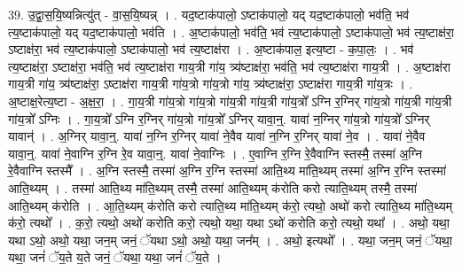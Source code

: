 \documentclass[17pt]{extarticle}
\begin{document}
39. उ॒द्वा॒स॒यि॒ष्यन्नित्यु॑त् - वा॒स॒यि॒ष्यन्न् । . यद॒ष्टाक॑पालो॒ ऽष्टाक॑पालो॒ यद् यद॒ष्टाक॑पालो॒ भव॑ति॒ भव॑ त्य॒ष्टाक॑पालो॒ यद् यद॒ष्टाक॑पालो॒ भव॑ति । . अ॒ष्टाक॑पालो॒ भव॑ति॒ भव॑ त्य॒ष्टाक॑पालो॒ ऽष्टाक॑पालो॒ भव॑ त्य॒ष्टाक्ष॑रा॒ ऽष्टाक्ष॑रा॒ भव॑ त्य॒ष्टाक॑पालो॒ ऽष्टाक॑पालो॒ भव॑ त्य॒ष्टाक्ष॑रा । . अ॒ष्टाक॑पाल॒ इत्य॒ष्टा - क॒पा॒लः॒ । . भव॑ त्य॒ष्टाक्ष॑रा॒ ऽष्टाक्ष॑रा॒ भव॑ति॒ भव॑ त्य॒ष्टाक्ष॑रा गाय॒त्री गा॑य॒ त्र्य॑ष्टाक्ष॑रा॒ भव॑ति॒ भव॑ त्य॒ष्टाक्ष॑रा गाय॒त्री । . अ॒ष्टाक्ष॑रा गाय॒त्री गा॑य॒ त्र्य॑ष्टाक्ष॑रा॒ ऽष्टाक्ष॑रा गाय॒त्री गा॑य॒त्रो गा॑य॒त्रो गा॑य॒ त्र्य॑ष्टाक्ष॑रा॒ ऽष्टाक्ष॑रा गाय॒त्री गा॑य॒त्रः । . अ॒ष्टाक्ष॒रेत्य॒ष्टा - अ॒क्ष॒रा॒ । . गा॒य॒त्री गा॑य॒त्रो गा॑य॒त्रो गा॑य॒त्री गा॑य॒त्री गा॑य॒त्रो᳚ ऽग्नि र॒ग्निर् गा॑य॒त्रो गा॑य॒त्री गा॑य॒त्री गा॑य॒त्रो᳚ ऽग्निः । . गा॒य॒त्रो᳚ ऽग्नि र॒ग्निर् गा॑य॒त्रो गा॑य॒त्रो᳚ ऽग्निर् यावा॒न्॒. यावा॑ न॒ग्निर् गा॑य॒त्रो गा॑य॒त्रो᳚ ऽग्निर् यावान्॑ । . अ॒ग्निर् यावा॒न्॒. यावा॑ न॒ग्नि र॒ग्निर् यावा॑ ने॒वैव यावा॑ न॒ग्नि र॒ग्निर् यावा॑ ने॒व । . यावा॑ ने॒वैव यावा॒न्॒. यावा॑ ने॒वाग्नि र॒ग्नि रे॒व यावा॒न्॒. यावा॑ ने॒वाग्निः । . ए॒वाग्नि र॒ग्नि रे॒वैवाग्नि स्तस्मै॒ तस्मा॑ अ॒ग्नि रे॒वैवाग्नि स्तस्मै᳚ । . अ॒ग्नि स्तस्मै॒ तस्मा॑ अ॒ग्नि र॒ग्नि स्तस्मा॑ आति॒थ्य मा॑ति॒थ्यम् तस्मा॑ अ॒ग्नि र॒ग्नि स्तस्मा॑ आति॒थ्यम् । . तस्मा॑ आति॒थ्य मा॑ति॒थ्यम् तस्मै॒ तस्मा॑ आति॒थ्यम् क॑रोति करो त्याति॒थ्यम् तस्मै॒ तस्मा॑ आति॒थ्यम् क॑रोति । . आ॒ति॒थ्यम् क॑रोति करो त्याति॒थ्य मा॑ति॒थ्यम् क॑रो॒ त्यथो॒ अथो॑ करो त्याति॒थ्य मा॑ति॒थ्यम् क॑रो॒ त्यथो᳚ । . क॒रो॒ त्यथो॒ अथो॑ करोति करो॒ त्यथो॒ यथा॒ यथा ऽथो॑ करोति करो॒ त्यथो॒ यथा᳚ । . अथो॒ यथा॒ यथा ऽथो॒ अथो॒ यथा॒ जन॒म् जनं॒ ॅयथा ऽथो॒ अथो॒ यथा॒ जन᳚म् । . अथो॒ इत्यथो᳚ । . यथा॒ जन॒म् जनं॒ ॅयथा॒ यथा॒ जनं॑ ॅय॒ते य॒ते जनं॒ ॅयथा॒ यथा॒ जनं॑ ॅय॒ते । \newline
\end{document}
